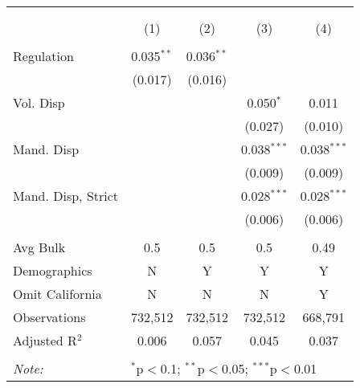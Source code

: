 
\begin{table}[!htbp] \centering 
  \caption{} 
  \label{} 
\begin{tabular}{@{\extracolsep{5pt}}lcccc} 
\\[-1.8ex]\hline 
\hline \\[-1.8ex] 
\\[-1.8ex] & (1) & (2) & (3) & (4)\\ 
\hline \\[-1.8ex] 
 Regulation & 0.035$^{**}$ & 0.036$^{**}$ &  &  \\ 
  & (0.017) & (0.016) &  &  \\ 
  Vol. Disp &  &  & 0.050$^{*}$ & 0.011 \\ 
  &  &  & (0.027) & (0.010) \\ 
  Mand. Disp &  &  & 0.038$^{***}$ & 0.038$^{***}$ \\ 
  &  &  & (0.009) & (0.009) \\ 
  Mand. Disp, Strict &  &  & 0.028$^{***}$ & 0.028$^{***}$ \\ 
  &  &  & (0.006) & (0.006) \\ 
 \hline \\[-1.8ex] 
Avg Bulk & 0.5 & 0.5 & 0.5 & 0.49 \\ 
Demographics & N & Y & Y & Y \\ 
Omit California & N & N & N & Y \\ 
Observations & 732,512 & 732,512 & 732,512 & 668,791 \\ 
Adjusted R$^{2}$ & 0.006 & 0.057 & 0.045 & 0.037 \\ 
\hline 
\hline \\[-1.8ex] 
\textit{Note:}  & \multicolumn{4}{l}{$^{*}$p$<$0.1; $^{**}$p$<$0.05; $^{***}$p$<$0.01} \\ 
\end{tabular} 
\end{table} 

